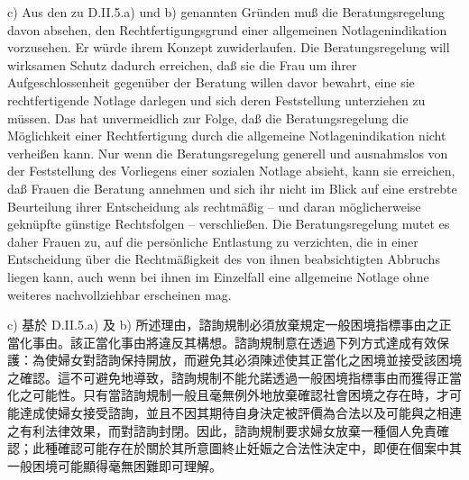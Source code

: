 \documentclass[12pt]{article}
\begin{document}
\begin{sourcepara}[title={原文D.86}]
c) Aus den zu D.II.5.a) und b) genannten Gründen muß die Beratungsregelung davon absehen, den Rechtfertigungsgrund einer allgemeinen Notlagenindikation vorzusehen. Er würde ihrem Konzept zuwiderlaufen. Die Beratungsregelung will wirksamen Schutz dadurch erreichen, daß sie die Frau um ihrer Aufgeschlossenheit gegenüber der Beratung willen davor bewahrt, eine sie rechtfertigende Notlage darlegen und sich deren Feststellung unterziehen zu müssen. Das hat unvermeidlich zur Folge, daß die Beratungsregelung die Möglichkeit einer Rechtfertigung durch die allgemeine Notlagenindikation nicht verheißen kann. Nur wenn die Beratungsregelung generell und ausnahmslos von der Feststellung des Vorliegens einer sozialen Notlage absieht, kann sie erreichen, daß Frauen die Beratung annehmen und sich ihr nicht im Blick auf eine erstrebte Beurteilung ihrer Entscheidung als rechtmäßig -- und daran möglicherweise geknüpfte günstige Rechtsfolgen -- verschließen. Die Beratungsregelung mutet es daher Frauen zu, auf die persönliche Entlastung zu verzichten, die in einer Entscheidung über die Rechtmäßigkeit des von ihnen beabsichtigten Abbruchs liegen kann, auch wenn bei ihnen im Einzelfall eine allgemeine Notlage ohne weiteres nachvollziehbar erscheinen mag.
\end{sourcepara}
\begin{transpara}
c) 基於 D.II.5.a) 及 b) 所述理由，諮詢規制必須放棄規定一般困境指標事由之正當化事由。該正當化事由將違反其構想。諮詢規制意在透過下列方式達成有效保護：為使婦女對諮詢保持開放，而避免其必須陳述使其正當化之困境並接受該困境之確認。這不可避免地導致，諮詢規制不能允諾透過一般困境指標事由而獲得正當化之可能性。只有當諮詢規制一般且毫無例外地放棄確認社會困境之存在時，才可能達成使婦女接受諮詢，並且不因其期待自身決定被評價為合法以及可能與之相連之有利法律效果，而對諮詢封閉。因此，諮詢規制要求婦女放棄一種個人免責確認；此種確認可能存在於關於其所意圖終止妊娠之合法性決定中，即便在個案中其一般困境可能顯得毫無困難即可理解。
\end{transpara}
\end{document}
